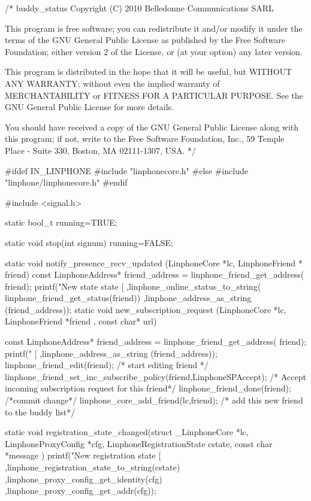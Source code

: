\begin{DoxyCodeInclude}

/*
buddy_status
Copyright (C) 2010  Belledonne Communications SARL 

This program is free software; you can redistribute it and/or
modify it under the terms of the GNU General Public License
as published by the Free Software Foundation; either version 2
of the License, or (at your option) any later version.

This program is distributed in the hope that it will be useful,
but WITHOUT ANY WARRANTY; without even the implied warranty of
MERCHANTABILITY or FITNESS FOR A PARTICULAR PURPOSE.  See the
GNU General Public License for more details.

You should have received a copy of the GNU General Public License
along with this program; if not, write to the Free Software
Foundation, Inc., 59 Temple Place - Suite 330, Boston, MA  02111-1307, USA.
*/

#ifdef IN_LINPHONE
#include "linphonecore.h"
#else
#include "linphone/linphonecore.h"
#endif

#include <signal.h>

static bool_t running=TRUE;

static void stop(int signum){
        running=FALSE;
}

static void notify_presence_recv_updated (LinphoneCore *lc,  LinphoneFriend *
      friend) {
        const LinphoneAddress* friend_address = linphone_friend_get_address(
      friend);
        printf("New state state [%
                                ,linphone_online_status_to_string(
      linphone_friend_get_status(friend))
                                ,linphone_address_as_string (friend_address));
}
static void new_subscription_request (LinphoneCore *lc,  LinphoneFriend *friend
      , const char* url) {
        const LinphoneAddress* friend_address = linphone_friend_get_address(
      friend);
        printf(" [%
                                ,linphone_address_as_string (friend_address));
        linphone_friend_edit(friend); /* start editing friend */
        linphone_friend_set_inc_subscribe_policy(friend,LinphoneSPAccept); /*
       Accept incoming subscription request for this friend*/
        linphone_friend_done(friend); /*commit change*/
        linphone_core_add_friend(lc,friend); /* add this new friend to the
       buddy list*/

}
static void registration_state_changed(struct _LinphoneCore *lc, 
      LinphoneProxyConfig *cfg, LinphoneRegistrationState cstate, const char *message
      ){
                printf("New registration state %
       [%
                                ,linphone_registration_state_to_string(cstate)
                                ,linphone_proxy_config_get_identity(cfg)
                                ,linphone_proxy_config_get_addr(cfg));
}


\end{DoxyCodeInclude}
